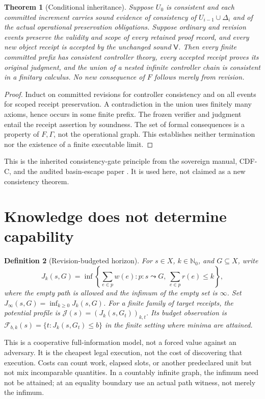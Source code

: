 \documentclass[11pt]{article}
\newtheorem{theorem}{Theorem}[section]
\newtheorem{definition}[theorem]{Definition}
\theoremstyle{remark}\newtheorem{remark}[theorem]{Remark}
\newcommand{\N}{\mathbb N_0}
\newcommand{\J}{\mathcal J}
\newcommand{\F}{\mathcal F}
\newcommand{\V}{\mathsf V}
\begin{document}
\begin{theorem}[Conditional inheritance]\label{thm:inherit}
Suppose $U_0$ is consistent and each committed increment carries sound evidence of consistency of $U_{i-1}\cup\Delta_i$ and of the actual operational preservation obligations. Suppose ordinary and revision events preserve the validity and scope of every retained proof record, and every new object receipt is accepted by the unchanged sound $\V$. Then every finite committed prefix has consistent controller theory, every accepted receipt proves its original judgment, and the union of a nested infinite controller chain is consistent in a finitary calculus. No new consequence of $F$ follows merely from revision.
\end{theorem}
\begin{proof}
Induct on committed revisions for controller consistency and on all events for scoped receipt preservation. A contradiction in the union uses finitely many axioms, hence occurs in some finite prefix. The frozen verifier and judgment entail the receipt assertion by soundness. The set of formal consequences is a property of $F,\Gamma$, not the operational graph. This establishes neither termination nor the existence of a finite executable limit.
\end{proof}
This is the inherited consistency-gate principle from the sovereign manual, CDF-C, and the audited basin-escape paper \cite{gift,cdf,basin}. It is used here, not claimed as a new consistency theorem.

\section{Knowledge does not determine capability}
\begin{definition}[Revision-budgeted horizon]
For $s\in X$, $k\in\N$, and $G\subseteq X$, write
\[
 J_k(s,G)=\inf\left\{\sum_{e\in p}w(e):p:s\leadsto G,\ \sum_{e\in p}r(e)\le k\right\},
\]
where the empty path is allowed and the infimum of the empty set is $\infty$. Set $J_\infty(s,G)=\inf_{k\ge0}J_k(s,G)$. For a finite family of target receipts, the potential profile is $\J(s)=(J_k(s,G_t))_{k,t}$. Its budget observation is $\F_{b,k}(s)=\{t:J_k(s,G_t)\le b\}$ in the finite setting where minima are attained.
\end{definition}
This is a cooperative full-information model, not a forced value against an adversary. It is the cheapest legal execution, not the cost of discovering that execution. Costs can count work, elapsed slots, or another predeclared unit but not mix incomparable quantities. In a countably infinite graph, the infimum need not be attained; at an equality boundary use an actual path witness, not merely the infimum.
\end{document}
